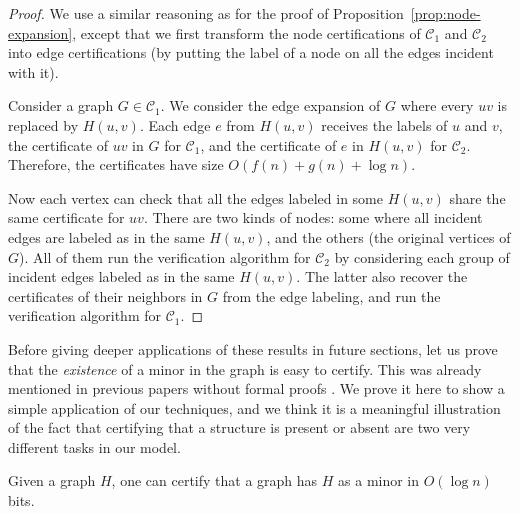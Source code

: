\documentclass[a4paper,thm-restate,USenglish]{lipics-v2019}
\begin{document}
\begin{proof}
We use a similar reasoning as for the proof of Proposition~\ref{prop:node-expansion}, except that we first transform the node certifications of $\mathcal{C}_1$ and $\mathcal{C}_2$ into edge certifications (by putting the label of a node on all the edges incident with it). 

Consider a graph $G\in \mathcal{C}_1$. We consider the edge expansion of $G$ where every $uv$ is replaced by $H(u,v)$. Each edge $e$ from $H(u,v)$ receives the labels of $u$ and $v$, the certificate of $uv$ in $G$ for $\mathcal{C}_1$, and the certificate of $e$ in $H(u,v)$ for $\mathcal{C}_2$. Therefore, the certificates have size $O(f(n)+g(n)+\log n)$.

Now each vertex can check that all the edges labeled in some $H(u,v)$ share the same certificate for $uv$. There are two kinds of nodes: some where all incident edges are labeled as in the same $H(u,v)$, and the others (the original vertices of $G$). All of them run the verification algorithm for $\mathcal{C}_2$ by considering each group of incident edges labeled as in the same $H(u,v)$. The latter also recover the certificates of  their neighbors in $G$ from the edge labeling, and run the verification algorithm for $\mathcal{C}_1$. 
\end{proof}

Before giving deeper applications of these results in future sections, let us prove that the \emph{existence} of a minor in the graph is easy to certify. 
This was already mentioned in previous papers without formal proofs \cite{FeuilloleyFMRRT20, FeuilloleyFMRRT21}. 
We prove it here to show a simple application of our techniques, and we think it is a meaningful illustration of the fact that certifying that a structure is present or absent are two very different tasks in our model.

\begin{corollary}
Given a graph $H$, one can certify that a graph has $H$ as a minor in $O(\log n)$ bits.
\end{corollary}
\end{document}
